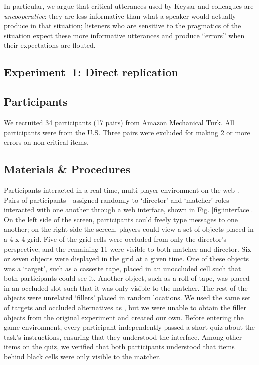 \documentclass[manuscript]{stjour}
\begin{document}
In particular, we argue that critical utterances used by Keysar and colleagues are \emph{uncooperative}: they are less informative than what a speaker would actually produce in that situation; listeners who are sensitive to the pragmatics of the situation expect these more informative utterances and produce ``errors'' when their expectations are flouted. 

\subsection{Experiment~1: Direct replication}
\label{sec:Exp1}

\subsection{Participants}

We recruited 34 participants (17 pairs) from Amazon Mechanical Turk. All participants were from the U.S. Three pairs were excluded for making 2 or more errors on non-critical items.

\subsection{Materials \& Procedures}


Participants interacted in a real-time, multi-player environment on the web \cite{Hawkins15_RealTimeWebExperiments}. 
Pairs of participants---assigned randomly to `director' and `matcher' roles---interacted with one another through a web interface, shown in Fig. \ref{fig:interface}. On the left side of the screen, participants could freely type messages to one another; on the right side the screen, players could view a set of objects placed in a 4 x 4 grid. Five of the grid cells were occluded from only the director's perspective, and the remaining 11 were visible to both matcher and director. Six or seven objects were displayed in the grid at a given time. One of these objects was a `target', such as a cassette tape, placed in an unoccluded cell such that both participants could see it. Another object, such as a roll of tape, was placed in an occluded slot such that it was only visible to the matcher. The rest of the objects were unrelated `fillers' placed in random locations. We used the same set of targets and occluded alternatives as \cite{KeysarLinBarr03_LimitsOnTheoryOfMindUse}, but we were unable to obtain the filler objects from the original experiment and created our own.
Before entering the game environment, every participant independently passed a short quiz about the task's instructions, ensuring that they understood the interface. Among other items on the quiz, we verified that both participants understood that items behind black cells were only visible to the matcher. 
\end{document}
